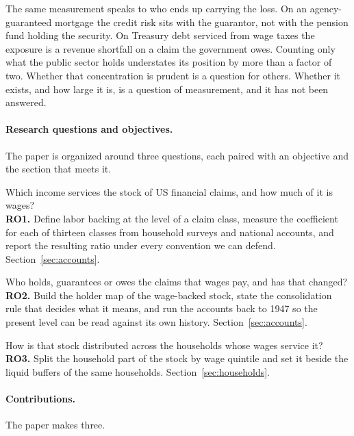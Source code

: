 The same measurement speaks to who ends up carrying the loss. On an agency-guaranteed mortgage
the credit risk sits with the guarantor, not with the pension fund holding the security. On
Treasury debt serviced from wage taxes the exposure is a revenue shortfall on a claim the
government owes. Counting only what the public sector holds understates its position by more
than a factor of two. Whether that concentration is prudent is a question for others. Whether it
exists, and how large it is, is a question of measurement, and it has not been answered.

\paragraph{Research questions and objectives.} The paper is organized around three questions,
each paired with an objective and the section that meets it.

\begin{description}[leftmargin=2.2em,style=nextline]
  \item[RQ1] Which income services the stock of US financial claims, and how much of it is
  wages? \\
  \textbf{RO1.} Define labor backing at the level of a claim class, measure the coefficient for
  each of thirteen classes from household surveys and national accounts, and report the resulting
  ratio under every convention we can defend. Section~\ref{sec:accounts}.
  \item[RQ2] Who holds, guarantees or owes the claims that wages pay, and has that changed? \\
  \textbf{RO2.} Build the holder map of the wage-backed stock, state the consolidation rule that
  decides what it means, and run the accounts back to 1947 so the present level can be read
  against its own history. Section~\ref{sec:accounts}.
  \item[RQ3] How is that stock distributed across the households whose wages service it? \\
  \textbf{RO3.} Split the household part of the stock by wage quintile and set it beside the
  liquid buffers of the same households. Section~\ref{sec:households}.
\end{description}

\paragraph{Contributions.} The paper makes three.

